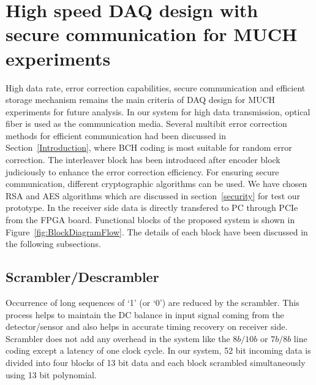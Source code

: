\documentclass[a4paper]{jpconf}
\begin{document}
\section{High speed DAQ design with secure communication for MUCH experiments}\label{SystemDesignDAQ}
High data rate, error correction capabilities, secure communication and efficient storage mechanism remains the main criteria of DAQ design for MUCH experiments for future analysis. In our system for high data transmission, optical fiber is used as the communication media. Several multibit error correction methods for efficient communication had been discussed in Section~\ref{Introduction}, where BCH coding is most suitable for random error correction. The interleaver block has been introduced after encoder block judiciously to enhance the error correction efficiency. For ensuring secure communication, different cryptographic algorithms can be used. We have chosen RSA and AES algorithms which are discussed in section~\ref{security} for test our prototype. In the receiver side data is directly transfered to PC through PCIe from the FPGA board. Functional blocks of the proposed system is shown in Figure~\ref{fig:BlockDiagramFlow}. The details of each block have been discussed in the following subsections. 

\vspace{-3 pc}
\subsection{Scrambler/Descrambler} Occurrence of long sequences of `1' (or `0') are reduced by the scrambler. This process helps to maintain the DC balance in input signal coming from the detector/sensor and also helps in accurate timing recovery on receiver side. Scrambler does not add any overhead in the system like the $8b/10b$ or $7b/8b$ line coding except a latency of one clock cycle. In our system, 52 bit incoming data is divided into four blocks of 13 bit data and each block scrambled simultaneously using 13 bit polynomial. 
\vspace{-1 pc}
\end{document}
